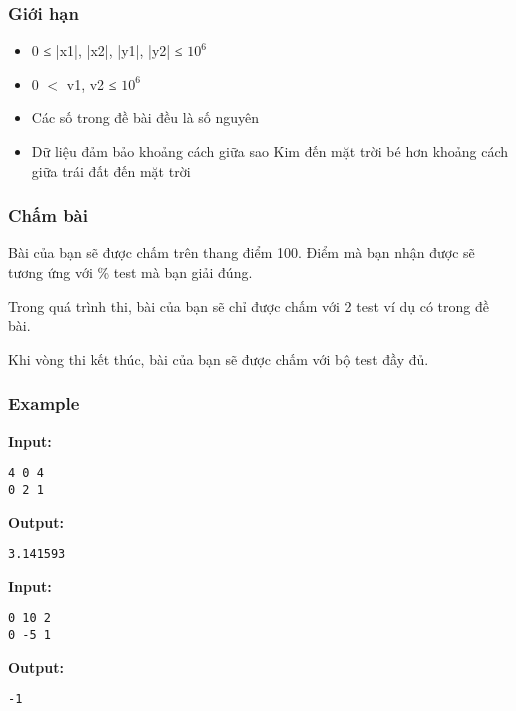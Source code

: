 \subsubsection{   Giới hạn  }
\begin{itemize}
	\item     0 ≤ |x1|, |x2|, |y1|, |y2| ≤ $10^{6}$
	\item     0 $<$ v1, v2 ≤ $10^{6}$
	\item     Các số trong đề bài đều là số nguyên   
	\item      Dữ liệu đảm bảo khoảng cách giữa sao Kim đến mặt trời bé hơn khoảng cách giữa trái đất đến mặt trời    
\end{itemize}

\subsubsection{   Chấm bài  }

   Bài của bạn sẽ được chấm trên thang điểm 100. Điểm mà bạn nhận được sẽ tương ứng với \% test mà bạn giải đúng.  

   Trong quá trình thi, bài của bạn sẽ chỉ được chấm với 2 test ví dụ có trong đề bài.  

   Khi vòng thi kết thúc, bài của bạn sẽ được chấm với bộ test đầy đủ.  
\begin{itemize}
\end{itemize}

\subsubsection{   Example  }

\textbf{    Input:   }
\begin{verbatim}
4 0 4
0 2 1\end{verbatim}

\textbf{    Output:   }
\begin{verbatim}
3.141593

\end{verbatim}



\textbf{    Input:   }
\begin{verbatim}
0 10 2
0 -5 1\end{verbatim}

\textbf{    Output:   }
\begin{verbatim}
-1\end{verbatim}
